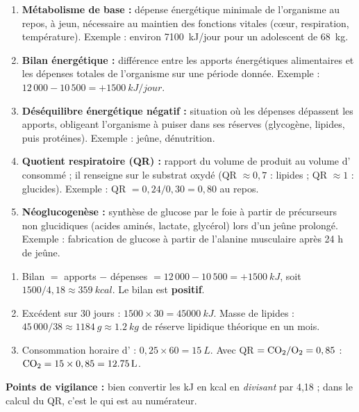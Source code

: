 \documentclass[11pt]{article}
\begin{document}
\begin{corrige}
\begin{enumerate}
\item \textbf{Métabolisme de base :} dépense énergétique minimale de l'organisme au repos, à jeun, nécessaire au maintien des fonctions vitales (cœur, respiration, température). Exemple : environ \SI{7100}{kJ/jour} pour un adolescent de \SI{68}{kg}.
\item \textbf{Bilan énergétique :} différence entre les apports énergétiques alimentaires et les dépenses totales de l'organisme sur une période donnée. Exemple : $12\,000 - 10\,500 = +\SI{1500}{kJ/jour}$.
\item \textbf{Déséquilibre énergétique négatif :} situation où les dépenses dépassent les apports, obligeant l'organisme à puiser dans ses réserves (glycogène, lipides, puis protéines). Exemple : jeûne, dénutrition.
\item \textbf{Quotient respiratoire (QR) :} rapport du volume de  produit au volume d' consommé ; il renseigne sur le substrat oxydé (QR $\approx 0,7$ : lipides ; QR $\approx 1$ : glucides). Exemple : QR $= 0,24/0,30 = 0,80$ au repos.
\item \textbf{Néoglucogenèse :} synthèse de glucose par le foie à partir de précurseurs non glucidiques (acides aminés, lactate, glycérol) lors d'un jeûne prolongé. Exemple : fabrication de glucose à partir de l'alanine musculaire après 24 h de jeûne.
\end{enumerate}
\end{corrige}

\begin{corrige}
\begin{enumerate}
\item Bilan $=$ apports $-$ dépenses $= 12\,000 - 10\,500 = +\SI{1500}{kJ}$, soit $1500 / 4,18 \approx \SI{359}{kcal}$. Le bilan est \textbf{positif}.
\item Excédent sur 30 jours : $1500 \times 30 = \SI{45000}{kJ}$. Masse de lipides : $45\,000 / 38 \approx \SI{1184}{g} \approx \SI{1,2}{kg}$ de réserve lipidique théorique en un mois.
\item Consommation horaire d' : $0,25 \times 60 = \SI{15}{L}$. Avec QR $= \ce{CO2}/\ce{O2} = 0,85$ : $\ce{CO2} = 15 \times 0,85 = \SI{12,75}{L}$.
\end{enumerate}
\textbf{Points de vigilance :} bien convertir les kJ en kcal en \emph{divisant} par 4,18 ; dans le calcul du QR, c'est le  qui est au numérateur.
\end{corrige}
\end{document}
